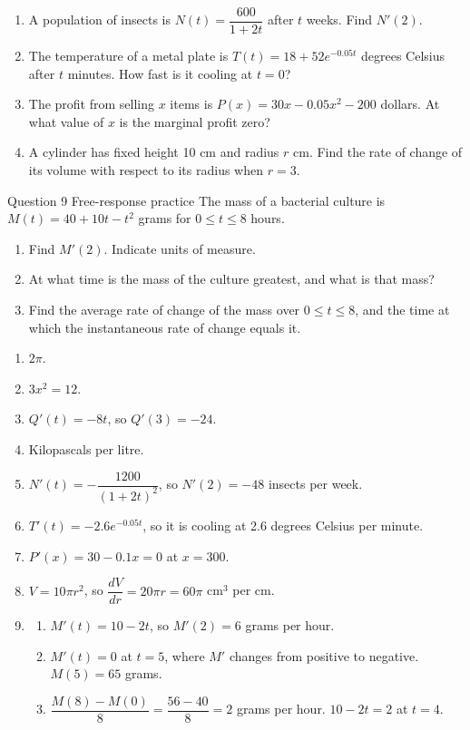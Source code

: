 \documentclass[11pt]{article}
\begin{document}
\begin{enumerate}[leftmargin=*,itemsep=2pt,start=5]
  \item A population of insects is $N(t)=\dfrac{600}{1+2t}$ after $t$ weeks. Find $N'(2)$.\work{2.8cm}
  \item The temperature of a metal plate is $T(t)=18+52e^{-0.05t}$ degrees Celsius after $t$ minutes. How fast is it cooling at $t=0$?\work{2.8cm}
  \item The profit from selling $x$ items is $P(x)=30x-0.05x^2-200$ dollars. At what value of $x$ is the marginal profit zero?\work{2.8cm}
  \item A cylinder has fixed height 10 cm and radius $r$ cm. Find the rate of change of its volume with respect to its radius when $r=3$.\work{2.8cm}
\end{enumerate}

\begin{frbox}{Question 9 \textperiodcentered{} Free-response practice}
The mass of a bacterial culture is $M(t)=40+10t-t^2$ grams for $0\le t\le8$ hours.
\begin{enumerate}[label=(\alph*),leftmargin=*,itemsep=2pt]
  \item Find $M'(2)$. Indicate units of measure.\work{2.6cm}
  \item At what time is the mass of the culture greatest, and what is that mass?\work{2.6cm}
  \item Find the average rate of change of the mass over $0\le t\le8$, and the time at which the instantaneous rate of change equals it.\work{2.6cm}
\end{enumerate}
\end{frbox}

\newpage
\begin{solbox}
\begin{enumerate}[leftmargin=*,itemsep=4pt]
  \item $2\pi$.
  \item $3x^2=12$.
  \item $Q'(t)=-8t$, so $Q'(3)=-24$.
  \item Kilopascals per litre.
  \item $N'(t)=-\dfrac{1200}{(1+2t)^2}$, so $N'(2)=-48$ insects per week.
  \item $T'(t)=-2.6e^{-0.05t}$, so it is cooling at 2.6 degrees Celsius per minute.
  \item $P'(x)=30-0.1x=0$ at $x=300$.
  \item $V=10\pi r^2$, so $\dfrac{dV}{dr}=20\pi r=60\pi$ cm$^3$ per cm.
  \item \begin{enumerate}[label=(\alph*),leftmargin=*,itemsep=3pt]
    \item $M'(t)=10-2t$, so $M'(2)=6$ grams per hour.
    \item $M'(t)=0$ at $t=5$, where $M'$ changes from positive to negative. $M(5)=65$ grams.
    \item $\dfrac{M(8)-M(0)}{8}=\dfrac{56-40}{8}=2$ grams per hour. $10-2t=2$ at $t=4$.
  \end{enumerate}
\end{enumerate}
\end{solbox}
\end{document}
